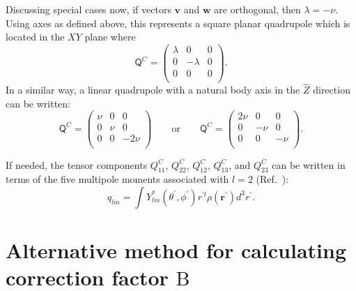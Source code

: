 Discussing special cases now, if vectors $\mathbf{v}$ and $\mathbf{w}$
are orthogonal, then $\lambda=-\nu$.  Using axes as defined above, 
this represents a square planar quadrupole which is located in the $XY$ plane where
\begin{equation*}
\mathsf{Q}^C=
\begin{pmatrix}
\lambda &0 & 0 \\
0 & -\lambda & 0 \\
0 & 0 & 0\\
\end{pmatrix} .
\end{equation*}
In a similar way,
a linear quadrupole with a natural body axis in the $\hat{Z}$ direction can be written:
\begin{equation*}
\mathsf{Q}^C=
\begin{pmatrix}
\nu &0 & 0 \\
0 & \nu & 0 \\
0 & 0 & -2\nu\\
\end{pmatrix} 
\qquad \textrm{or} \qquad
\mathsf{Q}^C=
\begin{pmatrix}
2\nu &0 & 0 \\
0 & -\nu & 0 \\
0 & 0 & -\nu\\
\end{pmatrix} .
\end{equation*}

If needed, the tensor components  $Q^C_{11}$, $Q^C_{22}$, $Q^C_{12}$, $Q^C_{13}$, and $Q^C_{23}$
can be written in terms of the five multipole moments associated with $l=2$ (Ref.~\cite{Jackson98}):
\begin{equation*}
q_{lm}=\int Y^*_{lm}(\theta^{\prime}, \phi^{\prime})r^{{\prime}l} \rho(\mathbf{r}^{\prime}) d^3 r^{\prime} .
\end{equation*}

\section{Alternative method for calculating correction factor $\mathrm{B}$}

